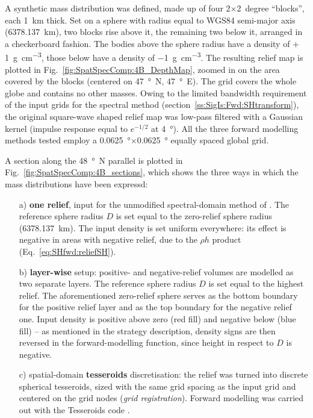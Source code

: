 \begin{subappendices}
A synthetic mass distribution was defined, made up of four 2$\times$2~degree ``blocks'', each \SI{1}{\kilo \metre} thick.
Set on a sphere with radius equal to WGS84 semi-major axis (\SI{6378.137}{\kilo \metre}), two blocks rise above it, the remaining two below it, arranged in a checkerboard fashion.
The bodies above the sphere radius have a density of $+$\SI{1}{\gram \per \cubic \centi \metre}, those below have a density of \SI{-1}{\gram \per \cubic \centi \metre}.
The resulting relief map is plotted in Fig.~\ref{fig:SpatSpecComp:4B_DepthMap}, zoomed in on the area covered by the blocks (centered on \SI{47}{\degree N}, \SI{47}{\degree E}).
The grid covers the whole globe and contains no other masses.
Owing to the limited bandwidth requirement of the input grids for the spectral method (section~\ref{ss:SigIs:Fwd:SHtransform}), the original square-wave shaped relief map was low-pass filtered with a Gaussian kernel (impulse response equal to $e^{-1/2}$ at \SI{4}{\degree}).
All the three forward modelling methods tested employ a \SI{0.0625}{\degree}$\times$\SI{0.0625}{\degree} equally spaced global grid.

A section along the \SI{48}{\degree N} parallel is plotted in Fig.~\ref{fig:SpatSpecComp:4B_sections}, which shows the three ways in which the mass distributions have been expressd:
\begin{enumerate}
\item[a)] \textbf{one relief}, input for the unmodified spectral-domain method of \textcite{Wieczorek2007}. The reference sphere radius $D$ is set equal to the zero-relief sphere radius (\SI{6378.137}{\kilo \metre}). The input density is set uniform everywhere: its effect is negative in areas with negative relief, due to the $\rho h$ product (Eq.~\ref{eq:SHfwd:reliefSH}).
\item[b)] \textbf{layer-wise} setup: positive- and negative-relief volumes are modelled as two separate layers. The reference sphere radius $D$ is set equal to the highest relief. The aforementioned zero-relief sphere serves as the bottom boundary for the positive relief layer and as the top boundary for the negative relief one. Input density is positive above zero (red fill) and negative below (blue fill) -- as mentioned in the strategy description, density signs are then reversed in the forward-modelling function, since height in respect to $D$ is negative.
\item[c)] spatial-domain \textbf{tesseroids} discretisation: the relief was turned into discrete spherical tesseroids, sized with the same grid spacing as the input grid and centered on the grid nodes (\textit{grid registration}). Forward modelling was carried out with the Tesseroids code \parencites{Uieda2016}{UiedaTesseroids}.
\end{enumerate}


\end{subappendices}
